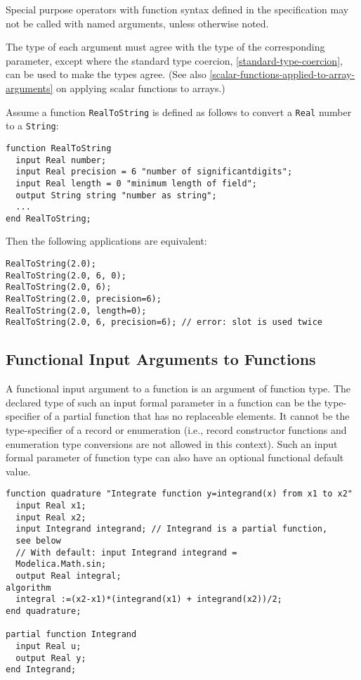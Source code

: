 Special purpose operators with function syntax defined in the
specification may not be called with named arguments, unless otherwise
noted.

The type of each argument must agree with the type of the corresponding
parameter, except where the standard type coercion, \cref{standard-type-coercion}, can be used to make
the types agree. (See also \cref{scalar-functions-applied-to-array-arguments} on applying scalar functions
to arrays.)

\begin{example}
Assume a function \lstinline!RealToString! is defined as follows to
convert a \lstinline!Real! number to a \lstinline!String!:
\begin{lstlisting}[language=modelica]
function RealToString
  input Real number;
  input Real precision = 6 "number of significantdigits";
  input Real length = 0 "minimum length of field";
  output String string "number as string";
  ...
end RealToString;
\end{lstlisting}
Then the following applications are equivalent:
\begin{lstlisting}[language=modelica]
RealToString(2.0);
RealToString(2.0, 6, 0);
RealToString(2.0, 6);
RealToString(2.0, precision=6);
RealToString(2.0, length=0);
RealToString(2.0, 6, precision=6); // error: slot is used twice
\end{lstlisting}
\end{example}

\subsection{Functional Input Arguments to Functions}\label{functional-input-arguments-to-functions}

A functional input argument to a function is an argument of function
type. The declared type of such an input formal parameter in a function
can be the type-specifier of a partial function that has no replaceable
elements. It cannot be the type-specifier of a record or enumeration
(i.e., record constructor functions and enumeration type
conversions are not allowed in this context). Such an input formal
parameter of function type can also have an optional functional default
value.

\begin{example}
\begin{lstlisting}[language=modelica]
function quadrature "Integrate function y=integrand(x) from x1 to x2"
  input Real x1;
  input Real x2;
  input Integrand integrand; // Integrand is a partial function,
  see below
  // With default: input Integrand integrand =
  Modelica.Math.sin;
  output Real integral;
algorithm
  integral :=(x2-x1)*(integrand(x1) + integrand(x2))/2;
end quadrature;

partial function Integrand
  input Real u;
  output Real y;
end Integrand;
\end{lstlisting}
\end{example}

